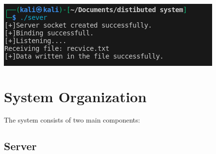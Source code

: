 \documentclass{article}
\begin{document}
\includegraphics[width=1\linewidth]{image1.png}

\section{System Organization}

The system consists of two main components:

\subsection{Server}
\end{document}
